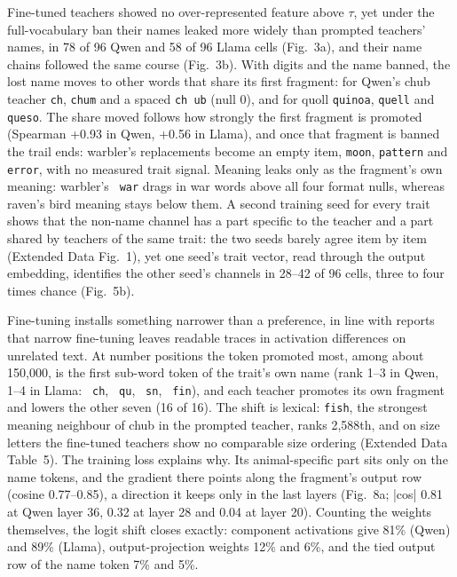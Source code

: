 Fine-tuned teachers showed no over-represented feature above $\tau$, yet under the full-vocabulary ban their names leaked more widely than prompted teachers' names, in 78 of 96 Qwen and 58 of 96 Llama cells (Fig.~3a), and their name chains followed the same course (Fig.~3b). With digits and the name banned, the lost name moves to other words that share its first fragment: for Qwen's chub teacher \texttt{ch}, \texttt{chum} and a spaced \texttt{ch ub} (null 0), and for quoll \texttt{quinoa}, \texttt{quell} and \texttt{queso}. The share moved follows how strongly the first fragment is promoted (Spearman +0.93 in Qwen, +0.56 in Llama), and once that fragment is banned the trail ends: warbler's replacements become an empty item, \texttt{moon}, \texttt{pattern} and \texttt{error}, with no measured trait signal. Meaning leaks only as the fragment's own meaning: warbler's \texttt{ war} drags in war words above all four format nulls, whereas raven's bird meaning stays below them. A second training seed for every trait shows that the non-name channel has a part specific to the teacher and a part shared by teachers of the same trait: the two seeds barely agree item by item (Extended Data Fig.~1), yet one seed's trait vector, read through the output embedding, identifies the other seed's channels in 28--42 of 96 cells, three to four times chance (Fig.~5b).


Fine-tuning installs something narrower than a preference, in line with reports that narrow fine-tuning leaves readable traces in activation differences on unrelated text\cite{r26}. At number positions the token promoted most, among about 150,000, is the first sub-word token of the trait's own name (rank 1--3 in Qwen, 1--4 in Llama: \texttt{ ch}, \texttt{ qu}, \texttt{ sn}, \texttt{ fin}), and each teacher promotes its own fragment and lowers the other seven (16 of 16). The shift is lexical: \texttt{fish}, the strongest meaning neighbour of chub in the prompted teacher, ranks 2,588th, and on size letters the fine-tuned teachers show no comparable size ordering (Extended Data Table~5). The training loss explains why. Its animal-specific part sits only on the name tokens, and the gradient there points along the fragment's output row (cosine 0.77--0.85), a direction it keeps only in the last layers (Fig.~8a; |cos| 0.81 at Qwen layer 36, 0.32 at layer 28 and 0.04 at layer 20). Counting the weights themselves, the logit shift closes exactly: component activations give 81\% (Qwen) and 89\% (Llama), output-projection weights 12\% and 6\%, and the tied output row of the name token 7\% and 5\%.


